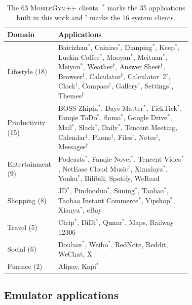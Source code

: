 \begin{table}[H]
\centering
\small
\caption{The 63 \textsc{MobileGym++} clients. $^\ast$ marks the 35 applications built in this work and $^\dagger$ marks the 16 system clients.}
\label{tab:app-mgpp-list}
\begin{tabular}{lp{0.74\linewidth}}
\toprule
Domain & Applications \\
\midrule
Lifestyle (18) & Baicizhan$^\ast$, Cainiao$^\ast$, Dianping$^\ast$, Keep$^\ast$, Luckin Coffee$^\ast$, Maoyan$^\ast$, Meituan$^\ast$, Meiyou$^\ast$, Weather$^\dagger$, Answer Sheet$^\dagger$, Browser$^\dagger$, Calculator$^\dagger$, Calculator~2$^\dagger$, Clock$^\dagger$, Compass$^\dagger$, Gallery$^\dagger$, Settings$^\dagger$, Themes$^\dagger$ \\
Productivity (15) & BOSS Zhipin$^\ast$, Days Matter$^\ast$, TickTick$^\ast$, Fanqie ToDo$^\ast$, flomo$^\ast$, Google Drive$^\ast$, Mail$^\ast$, Slack$^\ast$, Daily$^\ast$, Tencent Meeting, Calendar$^\dagger$, Phone$^\dagger$, Files$^\dagger$, Notes$^\dagger$, Messages$^\dagger$ \\
Entertainment (9) & Podcasts$^\ast$, Fanqie Novel$^\ast$, Tencent Video$^\ast$, NetEase Cloud Music$^\dagger$, Ximalaya$^\ast$, Youku$^\ast$, Bilibili, Spotify, WeRead \\
Shopping (8) & JD$^\ast$, Pinduoduo$^\ast$, Suning$^\ast$, Taobao$^\ast$, Taobao Instant Commerce$^\ast$, Vipshop$^\ast$, Xianyu$^\ast$, eBay \\
Travel (5) & Ctrip$^\ast$, DiDi$^\ast$, Qunar$^\ast$, Maps, Railway 12306 \\
Social (6) & Douban$^\ast$, Weibo$^\ast$, RedNote, Reddit, WeChat, X \\
Finance (2) & Alipay, Kapi$^\ast$ \\
\bottomrule
\end{tabular}
\end{table}

\subsection{Emulator applications}
\label{app:emu-apps}

